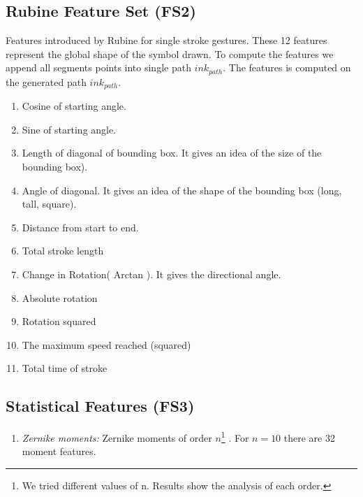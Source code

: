 %		
%		
%
\subsection{Rubine Feature Set (FS2)} Features introduced by Rubine\cite{gestureexample12} for single stroke gestures. These 12 features represent the global shape of the symbol drawn. To compute the features we append all segments points into single path $ink_{path}$. The features is computed on the generated path $ink_{path}$.%
\begin{enumerate}
	\item Cosine of starting angle.
	\item Sine of starting angle.
	\item Length of diagonal of bounding box. It gives an idea of the size of the bounding box).
	\item Angle of diagonal. It gives an idea of the shape of the bounding box (long, tall, square).
	\item Distance from start to end.  
	\item Total stroke length
	\item Change in Rotation( Arctan ). It gives the directional angle.
	\item Absolute rotation 
	\item Rotation squared 
	\item The maximum speed reached (squared) 
	\item Total time of stroke 
\end{enumerate}
\subsection{Statistical Features (FS3)} 
\begin{enumerate}
	\item \textsl{Zernike moments:} Zernike moments of order $n$\footnote{ We tried different values of n. Results show the analysis of each order.} \cite{HeloiseBeautification}.  For $n=10$ there are 32 moment features. 
\end{enumerate}
